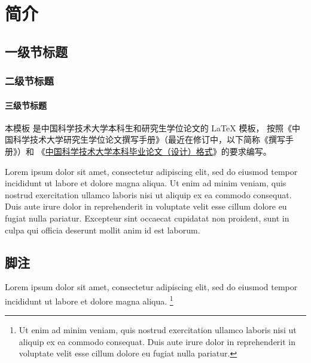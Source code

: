 
\chapter{简介}

\section{一级节标题}

\subsection{二级节标题}

\subsubsection{三级节标题}

本模板  是中国科学技术大学本科生和研究生学位论文的 \LaTeX{}
模板， 按照《中国科学技术大学研究生学位论文撰写手册》（最近在修订中，以下简称《撰写手册》）和
《\href{https://www.teach.ustc.edu.cn/?attachment_id=13867}
{中国科学技术大学本科毕业论文（设计）格式}》的要求编写。

Lorem ipsum dolor sit amet, consectetur adipiscing elit, sed do eiusmod tempor
incididunt ut labore et dolore magna aliqua.
Ut enim ad minim veniam, quis nostrud exercitation ullamco laboris nisi ut
aliquip ex ea commodo consequat.
Duis aute irure dolor in reprehenderit in voluptate velit esse cillum dolore eu
fugiat nulla pariatur.
Excepteur sint occaecat cupidatat non proident, sunt in culpa qui officia
deserunt mollit anim id est laborum.



\section{脚注}

Lorem ipsum dolor sit amet, consectetur adipiscing elit, sed do eiusmod tempor
incididunt ut labore et dolore magna aliqua.
\footnote{Ut enim ad minim veniam, quis nostrud exercitation ullamco laboris
  nisi ut aliquip ex ea commodo consequat.
  Duis aute irure dolor in reprehenderit in voluptate velit esse cillum dolore
  eu fugiat nulla pariatur.}
